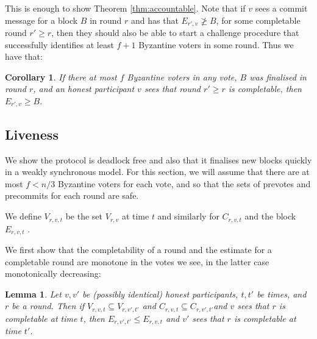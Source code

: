 \documentclass{article}
\newtheorem{lemma}[theorem]{Lemma}
\newtheorem{corollary}[theorem]{Corollary}
\begin{document}
This is enough to show Theorem \ref{thm:accountable}.  Note that if $v$ sees a commit message for a block $B$ in round $r$ and has that $E_{r',v} \not\geq B$, for some completable round $r' \geq r$, then they should also be able to start a challenge procedure that successfully identifies at least $f+1$ Byzantine voters in some round. Thus we have that:

\begin{corollary} \label{cor:overestimate-final}
If there at most $f$ Byzantine voters in any vote, $B$ was finalised in round $r$, and an honest participant $v$ sees that round $r' \geq r$ is completable, then $E_{r',v} \geq B$.
\end{corollary}

\subsection{Liveness }

We show the protocol is deadlock free and also that it finalises new blocks quickly in a weakly synchronous model.
For this section, we will assume that there are at most $f < n/3$ Byzantine voters for each vote, and so that the sets of prevotes and precommits for each round are safe.

We define $V_{r,v,t}$ be the set $V_{r,v}$ at time $t$ and similarly for $C_{r,v,t}$ and the block $E_{r,v,t}$ .

We first show that the completability of a round and the estimate for a completable round are monotone in the votes we see, in the latter case monotonically decreasing: 

\begin{lemma} \label{lem:message-monotonicity-completed-estimate}
Let $v,v'$ be (possibly identical) honest participants, $t,t'$ be times, and $r$ be a round.
Then if $V_{r,v,t} \subseteq V_{r,v',t'}$ and $C_{r,v,t} \subseteq C_{r,v',t'}$and $v$ sees that $r$ is completable at time $t$, then $E_{r,v',t'} \leq E_{r,v,t}$ and $v'$ sees that $r$ is completable at time $t'$.
\end{lemma}
\end{document}
